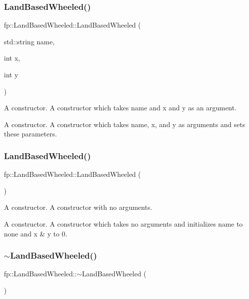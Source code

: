 \subsubsection{\texorpdfstring{Land\+Based\+Wheeled()}{LandBasedWheeled()}\hspace{0.1cm}{\footnotesize\ttfamily [1/2]}}
{\footnotesize\ttfamily fp\+::\+Land\+Based\+Wheeled\+::\+Land\+Based\+Wheeled (\begin{DoxyParamCaption}\item[{std\+::string}]{name,  }\item[{int}]{x,  }\item[{int}]{y }\end{DoxyParamCaption})}

A constructor. A constructor which takes name and x and y as an argument.

A constructor. A constructor which takes name, x, and y as arguments and sets these parameters. \mbox{\label{classfp_1_1_land_based_wheeled_a83884c16bfa5a6153958fd75d509123b}} 
\subsubsection{\texorpdfstring{Land\+Based\+Wheeled()}{LandBasedWheeled()}\hspace{0.1cm}{\footnotesize\ttfamily [2/2]}}
{\footnotesize\ttfamily fp\+::\+Land\+Based\+Wheeled\+::\+Land\+Based\+Wheeled (\begin{DoxyParamCaption}{ }\end{DoxyParamCaption})}

A constructor. A constructor with no arguments.

A constructor. A constructor which takes no arguments and initializes name to none and x \& y to 0. \mbox{\label{classfp_1_1_land_based_wheeled_a87d1d6bf36315ef9dbc79750a968fa2e}} 
\subsubsection{\texorpdfstring{$\sim$\+Land\+Based\+Wheeled()}{~LandBasedWheeled()}}
{\footnotesize\ttfamily fp\+::\+Land\+Based\+Wheeled\+::$\sim$\+Land\+Based\+Wheeled (\begin{DoxyParamCaption}{ }\end{DoxyParamCaption})\hspace{0.3cm}{\ttfamily [virtual]}}

